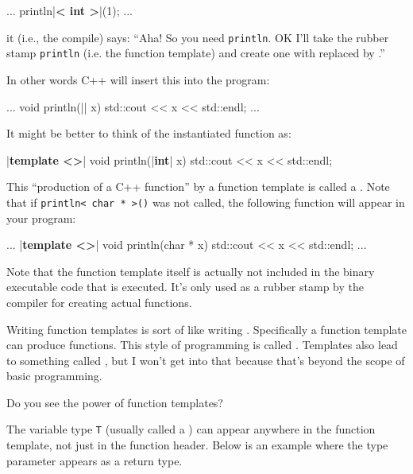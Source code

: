 \begin{consolethree}[escapeinside=||]
...
println|\textbf{< int >}|(1);
...
\end{consolethree}

it (i.e., the compile) says: ``Aha! So you need
\texttt{println}.
OK I'll take the rubber stamp \texttt{println} (i.e. the
function template) and create one with  replaced by
.''

In other words C++ will insert this into the program:

\begin{consolethree}[escapeinside=||]
...
void println(|| x)
{
    std::cout << x << std::endl;
}
...
\end{consolethree}

It might be better to think of the instantiated function as:

\begin{consolethree}[escapeinside=||]
|\textbf{template <>}|
void println(|\textbf{int}| x)
{
    std::cout << x << std::endl;
}
\end{consolethree}

This ``production of a C++ function'' by a function template is called a
. Note that if
\texttt{println< char * >()} was not called, the
following function will  appear in your program:

\begin{consolethree}[escapeinside=||]
...
|\textbf{template <>}|
void println(char * x)
{
    std::cout << x << std::endl;
}
...
\end{consolethree}

Note that the function template itself is actually not included in the
binary executable code that is executed. It's only used
as a rubber stamp by the compiler for creating actual functions.

Writing function templates is sort of like writing . Specifically a function template can produce functions. This style of programming is called . Templates also lead to something called , but I won't get into that because that's beyond the scope of basic programming.

Do you see the power of function templates?

The variable type \texttt{T} (usually called a ) can appear anywhere in the function template, not just in the function header. Below is an example where the type parameter appears as a return type.

